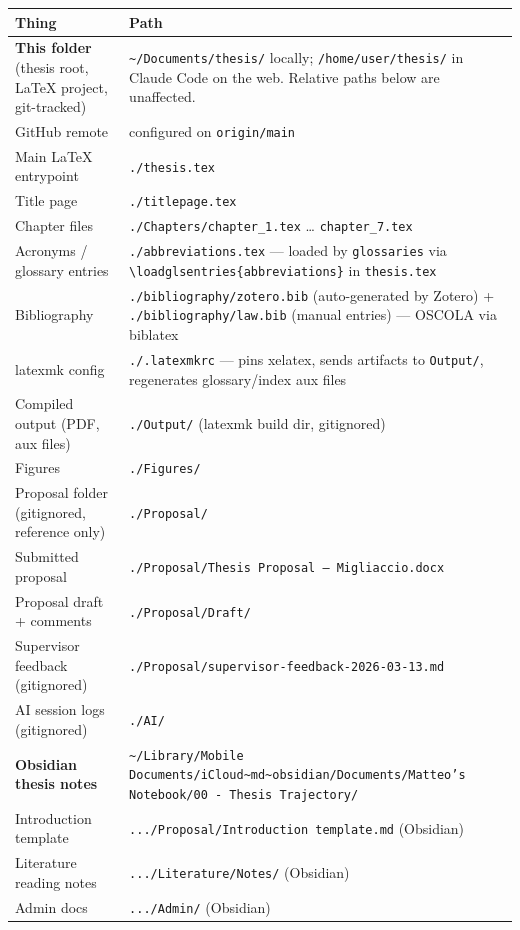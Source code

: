 \begin{longtable}{@{}>{\raggedright\arraybackslash}p{}
                    >{\raggedright\arraybackslash}p{}@{}}
  \hline
  \textbf{Thing} & \textbf{Path} \\
  \hline
  \endhead
  \textbf{This folder} (thesis root, LaTeX project, git-tracked)
    & \texttt{\textasciitilde/Documents/thesis/} locally;
      \texttt{/home/user/thesis/} in Claude Code on the web. Relative paths below
      are unaffected. \\
  GitHub remote
    & configured on \texttt{origin/main} \\
  Main LaTeX entrypoint
    & \texttt{./thesis.tex} \\
  Title page
    & \texttt{./titlepage.tex} \\
  Chapter files
    & \texttt{./Chapters/chapter\_1.tex} \ldots{} \texttt{chapter\_7.tex} \\
  Acronyms / glossary entries
    & \texttt{./abbreviations.tex} --- loaded by \texttt{glossaries} via
      \texttt{\textbackslash{}loadglsentries\{abbreviations\}} in
      \texttt{thesis.tex} \\
  Bibliography
    & \texttt{./bibliography/zotero.bib} (auto-generated by Zotero) +
      \texttt{./bibliography/law.bib} (manual entries) --- OSCOLA via biblatex \\
  latexmk config
    & \texttt{./.latexmkrc} --- pins xelatex, sends artifacts to
      \texttt{Output/}, regenerates glossary/index aux files \\
  Compiled output (PDF, aux files)
    & \texttt{./Output/} (latexmk build dir, gitignored) \\
  Figures
    & \texttt{./Figures/} \\
  Proposal folder (gitignored, reference only)
    & \texttt{./Proposal/} \\
  Submitted proposal
    & \texttt{./Proposal/Thesis Proposal -- Migliaccio.docx} \\
  Proposal draft + comments
    & \texttt{./Proposal/Draft/} \\
  Supervisor feedback (gitignored)
    & \texttt{./Proposal/supervisor-feedback-2026-03-13.md} \\
  AI session logs (gitignored)
    & \texttt{./AI/} \\
  \textbf{Obsidian thesis notes}
    & \texttt{\textasciitilde/Library/Mobile Documents/iCloud\textasciitilde{}md\textasciitilde{}obsidian/Documents/Matteo's Notebook/00 - Thesis Trajectory/} \\
  Introduction template
    & \texttt{.../Proposal/Introduction template.md} (Obsidian) \\
  Literature reading notes
    & \texttt{.../Literature/Notes/} (Obsidian) \\
  Admin docs
    & \texttt{.../Admin/} (Obsidian) \\
  \hline
\end{longtable}


